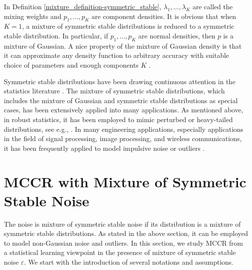 \documentclass[11pt]{article}
\begin{document}
In Definition \ref{mixture_definition-symmetric_stable}, $\lambda_1,\ldots,\lambda_K$ are called the mixing weights and $p_1,\ldots,p_K$ are component densities. It is obvious that when $K=1$, a mixture of symmetric stable distributions is reduced to a symmetric stable distribution. In particular, if $p_1,\ldots,p_K$ are normal densities, then $p$ is a mixture of Gaussian. A nice property of the mixture of Gaussian density is that it can approximate any density function to arbitrary accuracy with suitable choice of parameters and enough components $K$ \cite{titterington1985statistical,mclachlan1988mixture}. 

Symmetric stable distributions have been drawing continuous attention in the statistics literature \cite{fama1968some,fama1971parameter,dumouchel1973stable,miller1978properties,chen2004behavior}. The mixture of symmetric stable distributions, which includes the mixture of Gaussian and symmetric stable distributions as special cases, has been extensively applied into many applications. As mentioned above, in robust statistics, it has been employed to mimic perturbed or heavy-tailed distributions, see e.g., \cite{huber2009robust}. In many engineering applications, especially applications in the field of signal processing, image processing, and wireless communications, it has been frequently applied to model impulsive noise \cite{ shao1993signal,ambike1994detection,nikias1995signal,ilow1998analytic,kuruoglu1998near,eldar2001finite,kosko2001robust,brcich2005stability,lombardi2006line,	souryal2008soft,rajan2010diversity,park2011maximin} or outliers \cite{barnett1994outliers,aggarwal2015outlier}.


\section{MCCR with Mixture of Symmetric Stable Noise}\label{sec::MCCR_with_SaS}
The noise is mixture of symmetric stable noise if its distribution is a mixture of symmetric stable distributions. As stated in the above section, it can be employed to model non-Gaussian noise and outliers. In this section, we study MCCR from a statistical learning viewpoint in the presence of mixture of symmetric stable noise $\varepsilon$. We start with the introduction of several notations and assumptions.  
\end{document}
